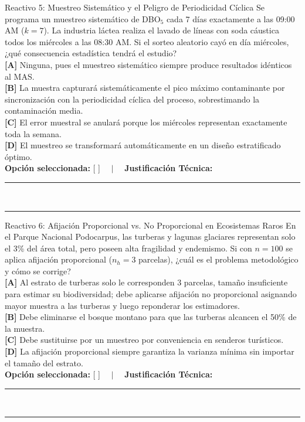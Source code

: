 \documentclass[11pt,a4paper]{article}
\begin{document}
\begin{reactivobox}{Reactivo 5: Muestreo Sistemático y el Peligro de Periodicidad Cíclica}
Se programa un muestreo sistemático de DBO$_5$ cada 7 días exactamente a las 09:00 AM ($k=7$). La industria láctea realiza el lavado de líneas con soda cáustica todos los miércoles a las 08:30 AM. Si el sorteo aleatorio cayó en día miércoles, ¿qué consecuencia estadística tendrá el estudio?\\
\textbf{[A]} Ninguna, pues el muestreo sistemático siempre produce resultados idénticos al MAS.\\
\textbf{[B]} La muestra capturará sistemáticamente el pico máximo contaminante por sincronización con la periodicidad cíclica del proceso, sobrestimando la contaminación media.\\
\textbf{[C]} El error muestral se anulará porque los miércoles representan exactamente toda la semana.\\
\textbf{[D]} El muestreo se transformará automáticamente en un diseño estratificado óptimo.\\[4pt]
\textbf{Opción seleccionada:} [ \quad ] $\quad \vert \quad$ \textbf{Justificación Técnica:}\\
\rule{\linewidth}{0.4pt}\\[2pt]
\rule{\linewidth}{0.4pt}
\end{reactivobox}

\begin{reactivobox}{Reactivo 6: Afijación Proporcional vs. No Proporcional en Ecosistemas Raros}
En el Parque Nacional Podocarpus, las turberas y lagunas glaciares representan solo el 3\% del área total, pero poseen alta fragilidad y endemismo. Si con $n = 100$ se aplica afijación proporcional ($n_h = 3$ parcelas), ¿cuál es el problema metodológico y cómo se corrige?\\
\textbf{[A]} Al estrato de turberas solo le corresponden 3 parcelas, tamaño insuficiente para estimar su biodiversidad; debe aplicarse afijación no proporcional asignando mayor muestra a las turberas y luego reponderar los estimadores.\\
\textbf{[B]} Debe eliminarse el bosque montano para que las turberas alcancen el 50\% de la muestra.\\
\textbf{[C]} Debe sustituirse por un muestreo por conveniencia en senderos turísticos.\\
\textbf{[D]} La afijación proporcional siempre garantiza la varianza mínima sin importar el tamaño del estrato.\\[4pt]
\textbf{Opción seleccionada:} [ \quad ] $\quad \vert \quad$ \textbf{Justificación Técnica:}\\
\rule{\linewidth}{0.4pt}\\[2pt]
\rule{\linewidth}{0.4pt}
\end{reactivobox}
\end{document}
